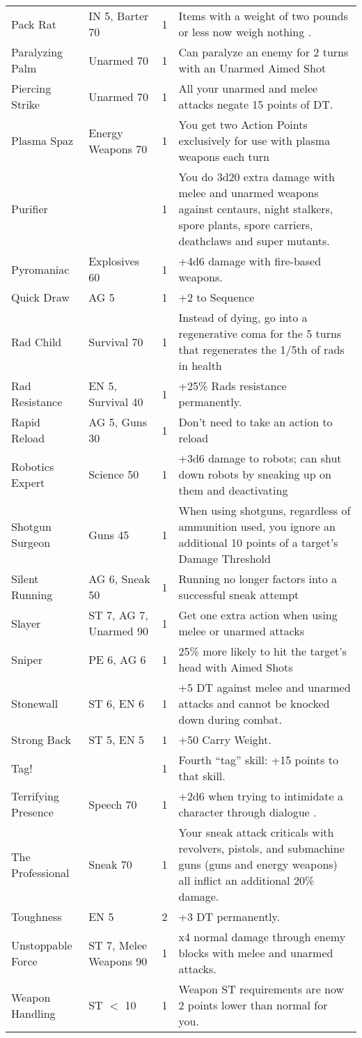\begin{longtable}{|p{3.3cm}|p{3.1cm}|p{1.2cm}|p{8.4cm}|}
Pack Rat & IN 5, Barter 70 & 1 & Items with a weight of two pounds or less now weigh nothing . \\
Paralyzing Palm & Unarmed 70 & 1 & Can paralyze an enemy for 2 turns with an Unarmed Aimed Shot \\
Piercing Strike & Unarmed 70 & 1 & All your unarmed and melee attacks negate 15 points of DT. \\
Plasma Spaz & Energy Weapons 70 & 1 & You get two Action Points exclusively for use with plasma weapons each turn \\
Purifier & & 1 & You do 3d20 extra damage with melee and unarmed weapons against centaurs, night stalkers, spore plants, spore carriers, deathclaws and super mutants. \\
Pyromaniac & Explosives 60 & 1 & +4d6 damage with fire-based weapons. \\
Quick Draw & AG 5 & 1 & +2 to Sequence \\
Rad Child & Survival 70 & 1 & Instead of dying, go into a regenerative coma for the 5 turns that regenerates the 1/5th of rads in health \\
Rad Resistance & EN 5, Survival 40 & 1 & +25\% Rads resistance permanently. \\
Rapid Reload & AG 5, Guns 30 & 1 & Don’t need to take an action to reload \\
Robotics Expert & Science 50 & 1 & +3d6 damage to robots; can shut down robots by sneaking up on them and deactivating \\
Shotgun Surgeon & Guns 45 & 1 & When using shotguns, regardless of ammunition used, you ignore an additional 10 points of a target's Damage Threshold \\
Silent Running & AG 6, Sneak 50 & 1 & Running no longer factors into a successful sneak attempt \\
Slayer & ST 7, AG 7, Unarmed 90 & 1 & Get one extra action when using melee or unarmed attacks \\
Sniper & PE 6, AG 6 & 1 & 25\% more likely to hit the target's head with Aimed Shots \\
Stonewall & ST 6, EN 6 & 1 & +5 DT against melee and unarmed attacks and cannot be knocked down during combat. \\
Strong Back & ST 5, EN 5 & 1 & +50 Carry Weight. \\
Tag! & & 1 & Fourth ``tag'' skill: +15 points to that skill. \\
Terrifying Presence & Speech 70 & 1 & +2d6 when trying to intimidate a character through dialogue . \\
The Professional & Sneak 70 & 1 & Your sneak attack criticals with revolvers, pistols, and submachine guns (guns and energy weapons) all inflict an additional 20\% damage. \\
Toughness & EN 5 & 2 & +3 DT permanently. \\
Unstoppable Force & ST 7, Melee Weapons 90 & 1 & x4 normal damage through enemy blocks with melee and unarmed attacks. \\
Weapon Handling & ST $<$ 10 & 1 & Weapon ST requirements are now 2 points lower than normal for you. \\

\hline
\end{longtable}
